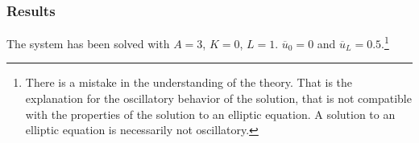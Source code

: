 \documentclass[a4paper,12pt]{article}
\makeatletter
\newenvironment{figurehere}
  {\def\@captype{figure}}
  {}
\makeatother
\begin{document}
\subsubsection{Results}
The system has been solved with $A=3$, $K=0$, $L=1$. $\overline{u}_0 = 0$ and $\overline{u}_L=0.5$.\footnote{There is a mistake in the understanding of the theory. That is the explanation for the oscillatory behavior of the solution, that is not compatible with the properties of the solution to an elliptic equation. A solution to an elliptic equation is necessarily not oscillatory.}
\begin{center}
\begin{figurehere}

\end{figurehere}
\end{center}
\end{document}
